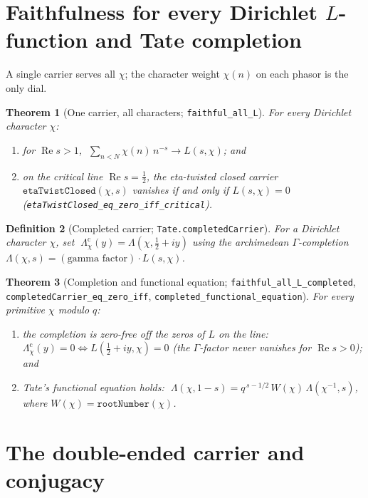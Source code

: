 \documentclass[11pt]{article}
\newtheorem{definition}{Definition}[section]
\newtheorem{theorem}[definition]{Theorem}
\DeclareMathOperator{\Ree}{Re}
\newcommand{\code}[1]{\texttt{#1}}
\begin{document}
\section{Faithfulness for every Dirichlet $L$-function and Tate completion}\label{sec:allL}

A single carrier serves all $\chi$; the character weight $\chi(n)$ on each phasor is the only dial.

\begin{theorem}[One carrier, all characters; \code{faithful\_all\_L}]\label{thm:alll}
For every Dirichlet character $\chi$:
\begin{enumerate}[label=\textup{(\roman*)}]
\item for $\Ree s>1$, $\;\sum_{n<N}\chi(n)\,n^{-s}\to L(s,\chi)$; and
\item on the critical line $\Ree s=\tfrac12$, the eta-twisted closed carrier
$\code{etaTwistClosed}(\chi,s)$ vanishes if and only if $L(s,\chi)=0$
(\code{etaTwistClosed\_eq\_zero\_iff\_critical}).
\end{enumerate}
\end{theorem}

\begin{definition}[Completed carrier; \code{Tate.completedCarrier}]\label{def:completed}
For a Dirichlet character $\chi$, set $\;\Lambda_\chi^{\mathrm{c}}(y)=\Lambda(\chi,\tfrac12+iy)$ using
the archimedean $\Gamma$-completion $\Lambda(\chi,s)=(\text{gamma factor})\cdot L(s,\chi)$.
\end{definition}

\begin{theorem}[Completion and functional equation; \code{faithful\_all\_L\_completed}, \code{completedCarrier\_eq\_zero\_iff}, \code{completed\_functional\_equation}]\label{thm:tate}
For every \emph{primitive} $\chi$ modulo $q$:
\begin{enumerate}[label=\textup{(\roman*)}]
\item the completion is zero-free off the zeros of $L$ on the line: $\Lambda_\chi^{\mathrm{c}}(y)=0
\iff L(\tfrac12+iy,\chi)=0$ (the $\Gamma$-factor never vanishes for $\Ree s>0$); and
\item Tate's functional equation \cite{Tate1967} holds:
$\;\Lambda(\chi,1-s)=q^{\,s-1/2}\,W(\chi)\,\Lambda(\chi^{-1},s)$,
where $W(\chi)=\code{rootNumber}(\chi)$.
\end{enumerate}
\end{theorem}

\section{The double-ended carrier and conjugacy}\label{sec:double}
\end{document}
